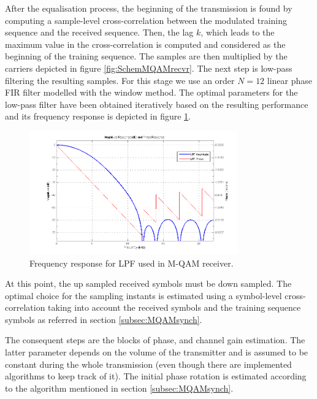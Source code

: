 \documentclass[12pt,a4paper,openright]{report}
\begin{document}
 
 After the equalisation process, the beginning of the transmission is found by computing a sample-level cross-correlation between the modulated training sequence and the received sequence. Then, the lag $k$, which leads to the maximum value in the cross-correlation is computed and considered as the beginning of the training sequence. The samples are then multiplied by the carriers depicted in figure \ref{fig:SchemMQAMrecvr}. The next step is low-pass filtering the resulting samples. For this stage we use an order $N=12$ linear phase FIR filter modelled with the window method. The optimal parameters for the low-pass filter have been obtained iteratively based on the resulting performance and its frequency response is depicted in figure \ref{fig:LPFIR}. 
 
 \begin{figure}[h]
   \centering
     \includegraphics[width=0.8\textwidth]{LPFIR.png}
     \caption[Frequency response for LPF used in M-QAM receiver.]{Frequency response for LPF used in M-QAM receiver.}
     \label{fig:LPFIR}
 \end{figure}
 
 
At this point, the up sampled received symbols must be down sampled. The optimal choice for the sampling instants is estimated using a symbol-level cross-correlation taking into account the received symbols and the training sequence symbols as referred in section \ref{subsec:MQAMsynch}. 

The consequent steps are the blocks of phase, and channel gain estimation. The latter parameter depends on the volume of the transmitter and is assumed to be constant during the whole transmission (even though there are implemented algorithms to keep track of it). The initial phase rotation is estimated according to the algorithm mentioned in section \ref{subsec:MQAMsynch}.
\end{document}
